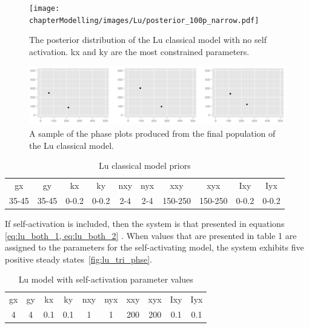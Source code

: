 \begin{figure}[p]
\centering
\texttt{[image: chapterModelling/images/Lu/posterior\_100p\_narrow.pdf]}
\caption[The posterior distribution of the Lu classical model with no self activation]{The posterior distribution of the Lu classical model with no self activation. kx and ky are the most constrained parameters.}
\label{fig:lu_bistable}
\end{figure}


\clearpage
\begin{figure}[p]
\centering
\includegraphics[scale=0.4]{chapterModelling/images/Lu/phase_plot.png}
\caption{A sample of the phase plots produced from the final population of the Lu classical model.}
\label{fig:lu_phase}
\end{figure}

\begin{table}[p]
\centering
\caption{Lu classical model priors}
\label{tab:lu}
\begin{tabular}{cccccccccc}
gx    & gy    & kx    & ky    & nxy & nyx & xxy     & xyx     & Ixy   & Iyx \\
35-45 & 35-45 & 0-0.2 & 0-0.2 & 2-4 & 2-4 & 150-250 & 150-250 & 0-0.2 &   0-0.2 
\end{tabular}
\end{table}

If self-activation is included, then the system is that presented in equations \eqref{eq:lu_both_1, eq:lu_both_2} . When values that are presented in table 1 are assigned to the parameters for the self-activating model, the system exhibits five positive steady states~\ref{fig:lu_tri_phse}. 

\clearpage
\begin{table}[p]
\centering
\caption{Lu model with self-activation parameter values}
\label{tab:lu_dp_tri}
\begin{tabular}{cccccccccc}
gx    & gy    & kx    & ky    & nxy & nyx & xxy     & xyx     & Ixy   & Iyx \\
4&4     &0.1   & 0.1   &  1  &  1  &  200    &  200    & 0.1    &   0.1
\end{tabular}
\end{table}

